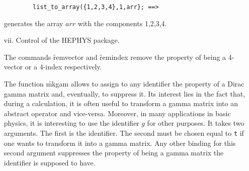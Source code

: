 \begin{itemize}
\begin{verbatim}
        list_to_array({1,2,3,4},1,arr}; ==> 
\end{verbatim}
generates the array $arr$ with the components 1,2,3,4.
\item[vii.] Control of the \textsc{HEPHYS} package.  

\hypertarget{command:REMVECTOR}{}
\hypertarget{command:REMINDEX}{}
The commands \f{remvector} and \f{remindex} remove the property of 
being a 4-vector or a 4-index respectively. 

\hypertarget{operator:MKGAM}{}
The function \f{mkgam} allows to assign to any identifier the property 
of a Dirac gamma matrix and, eventually, to suppress it. Its interest lies 
in the fact that, during a calculation, it is often useful to transform 
a gamma matrix into an abstract operator and vice-versa. Moreover, in many 
applications in basic physics, it is interesting to use the identifier $g$ 
for other purposes.  
It takes two arguments. The first is the identifier. The second must be 
chosen equal to \texttt{t} if one wants to transform it into a gamma matrix. Any
other binding for this second argument suppresses the property of being 
a gamma matrix the identifier is supposed to have. 
\end{itemize}
